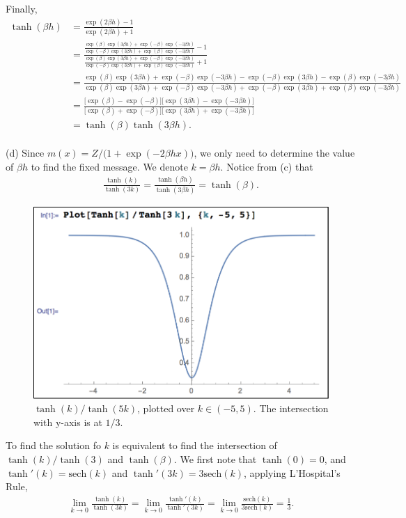 \documentclass{article}
\newcommand{\qeds}{\hfill\qedsymbol}
\begin{document}
Finally,
\begin{align*}
	\tanh(\beta h) &= \frac{\exp(2\beta h) - 1}{ \exp(2\beta h) + 1} \\
	&= \frac{\frac{\exp(\beta)\exp(3\beta h) +
	        \exp(-\beta)\exp(-3\beta h)}
	       {\exp(-\beta)\exp(3\beta h) +
	        \exp(\beta)\exp(-3\beta h)} - 1}
	        {\frac{\exp(\beta)\exp(3\beta h) +
	        \exp(-\beta)\exp(-3\beta h)}
	       {\exp(-\beta)\exp(3\beta h) +
	        \exp(\beta)\exp(-3\beta h)} + 1} \\
    &= \frac{\exp(\beta)\exp(3\beta h) + \exp(-\beta)\exp(-3\beta h) -
             {\exp(-\beta)\exp(3\beta h) - \exp(\beta)\exp(-3\beta h)}}
            {\exp(\beta)\exp(3\beta h) + \exp(-\beta)\exp(-3\beta h) +
             {\exp(-\beta)\exp(3\beta h) + \exp(\beta)\exp(-3\beta h)}} \\
    &= \frac{\big[\exp(\beta) - \exp(-\beta)\big]
             \big[\exp(3\beta h) - \exp(-3\beta h)\big]}
            {\big[\exp(\beta) + \exp(-\beta)\big]
             \big[\exp(3\beta h) + \exp(-3\beta h)\big]}\\
    &= \tanh(\beta) \tanh(3\beta h).
\end{align*}\qeds
\\

\noindent
(d) Since $m(x) = Z/\big(1 + \exp(-2\beta h x)\big)$, we only need to determine the value
of $\beta h$ to find the fixed message. We denote $k = \beta h$. Notice from (c) that
\begin{align*}
	\frac{\tanh(k)}{\tanh(3k)} = \frac{\tanh(\beta h)}{\tanh(3\beta h)} = \tanh(\beta).
\end{align*}
%
\begin{figure}[h]
  \centering
  \includegraphics[width=0.4\columnwidth]{5d.pdf}
    \vspace{-0.1cm}
  \caption{$\tanh(k)/\tanh(5k)$, plotted over $k\in(-5,5)$. The intersection with y-axis is at $1/3$.}
  \label{f:5d}
\end{figure}
%

To find the solution fo $k$ is equivalent to find the intersection of $\tanh(k)/\tanh(3)$ and $\tanh(\beta)$.
We first note that $\tanh(0) = 0$, and $\tanh'(k) = \text{sech}(k)$ and $\tanh'(3k) = 3\text{sech}(k)$,
applying L'Hospital's Rule,
\begin{align*}
	\lim_{k\to 0} \frac{\tanh(k)}{\tanh(3k)} = \lim_{k\to 0} \frac{\tanh'(k)}{\tanh'(3k)} = \lim_{k\to 0} \frac{\text{sech}(k)}{3\text{sech}(k)} = \frac{1}{3}.
\end{align*}
\end{document}
